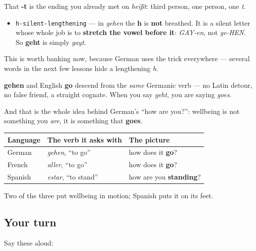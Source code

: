 That \textbf{-t} is the ending you already met on \emph{heißt}: third person, one person, one \emph{t}.

\begin{sounds}
\begin{itemize}
\raggedright
  \item \texttt{h-silent-lengthening} — in \emph{gehen} the \textbf{h} is \textbf{not} breathed. It is a silent letter whose whole job is to \textbf{stretch the vowel before it}: \emph{GAY-en}, not \emph{ge-HEN}. So \textbf{geht} is simply \emph{gayt}.
\end{itemize}

This is worth banking now, because German uses the trick everywhere — several words in the next few lessons hide a lengthening \emph{h}.
\end{sounds}

\begin{cousinweb}
\textbf{gehen} and English \textbf{go} descend from the \emph{same} Germanic verb — no Latin detour, no false friend, a straight cognate. When you say \emph{geht}, you are saying \emph{goes}.

And that is the whole idea behind German's \textquotedblleft{}how are you?\textquotedblright{}: wellbeing is not something you \emph{are}, it is something that \textbf{goes}.

\noindent
\begin{tabularx}{\linewidth}{@{}>{\raggedright\arraybackslash}X>{\raggedright\arraybackslash}X>{\raggedright\arraybackslash}X@{}}
\toprule
\textbf{Language} & \textbf{The verb it asks with} & \textbf{The picture} \\
\midrule
German & \emph{gehen}, \textquotedblleft{}to go\textquotedblright{} & how does it \textbf{go}? \\
French & \emph{aller}, \textquotedblleft{}to go\textquotedblright{} & how does it \textbf{go}? \\
Spanish & \emph{estar}, \textquotedblleft{}to stand\textquotedblright{} & how are you \textbf{standing}? \\
\bottomrule
\end{tabularx}

Two of the three put wellbeing in motion; Spanish puts it on its feet.
\end{cousinweb}

\subsection*{Your turn}
Say these aloud:

